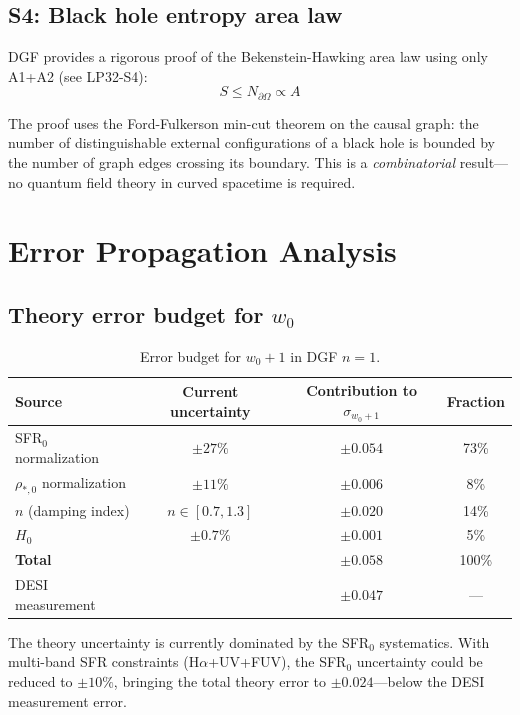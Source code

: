 \documentclass[12pt,a4paper]{article}
\begin{document}
\subsection{S4: Black hole entropy area law}

DGF provides a rigorous proof of the Bekenstein-Hawking area law using only A1+A2 (see LP32-S4):
\begin{equation}
S \leq N_{\partial\Omega} \propto A
\end{equation}

The proof uses the Ford-Fulkerson min-cut theorem on the causal graph: the number of distinguishable external configurations of a black hole is bounded by the number of graph edges crossing its boundary. This is a {\it combinatorial} result---no quantum field theory in curved spacetime is required.

\section{Error Propagation Analysis}

\subsection{Theory error budget for $w_0$}

\begin{table}[htbp]
\centering
\caption{Error budget for $w_0+1$ in DGF $n=1$.}
\begin{tabular}{lccc}
\toprule
Source & Current uncertainty & Contribution to $\sigma_{w_0+1}$ & Fraction \\
\midrule
SFR$_0$ normalization & $\pm27\%$ \cite{madau2014,driver2018} & $\pm0.054$ & 73\% \\
$\rho_{*,0}$ normalization & $\pm11\%$ \cite{driver2018} & $\pm0.006$ & 8\% \\
$n$ (damping index) & $n\in[0.7,1.3]$ & $\pm0.020$ & 14\% \\
$H_0$ & $\pm0.7\%$ \cite{planck2018} & $\pm0.001$ & 5\% \\
\midrule
{\bf Total} & & {\bf $\pm0.058$} & 100\% \\
DESI measurement & & $\pm0.047$ & --- \\
\bottomrule
\end{tabular}
\end{table}

The theory uncertainty is currently dominated by the SFR$_0$ systematics. With multi-band SFR constraints (H$\alpha$+UV+FUV), the SFR$_0$ uncertainty could be reduced to $\pm10\%$, bringing the total theory error to $\pm0.024$---below the DESI measurement error.
\end{document}

